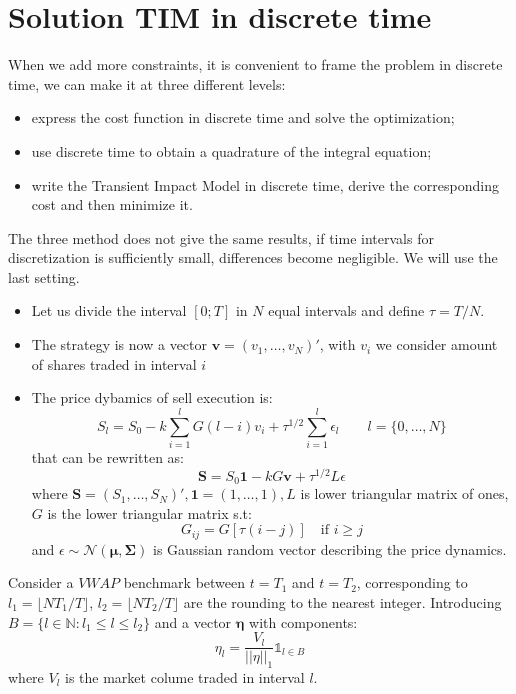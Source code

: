 \section{Solution TIM in discrete time}
When we add more constraints, it is convenient to frame the problem in discrete time, we can make it at three different levels:
\begin{itemize}
	\item express the cost function in discrete time and solve the optimization;
	\item use discrete time to obtain a quadrature of the integral equation;
	\item write the Transient Impact Model in discrete time, derive the corresponding cost and then minimize it.
\end{itemize}
The three method does not give the same results, if time intervals for discretization is sufficiently small, differences become negligible. We will use the last setting.
\begin{mysetting}
	\begin{itemize}
		\item Let us divide the interval $[0;T]$ in $N$ equal intervals and define $\tau = T/N$.
		\item The strategy is now a vector $\textbf{v} = (v_1,\ldots,v_N)'$, with $v_i$ we consider amount of shares traded in interval $i$
		\item The price dybamics of sell execution is:
		\[
		S_l = S_0 -k\sum_{i=1}^{l} G(l-i)v_i + \tau^{1/2} \sum_{i=1}^{l} \epsilon_l \qquad l = \{0,\ldots, N\}
		\]
		that can be rewritten as:
		\[
		\textbf{S} =S_0 \textbf{1} -kG \textbf{v}+ \tau^{1/2} L\epsilon
		\]
		where $\textbf{S} = (S_1,\dots,S_N)', \textbf{1} = (1,\ldots,1), L$ is lower triangular matrix of ones, $G$ is the lower triangular matrix s.t:
		\[
		G_{ij} = G[\tau(i-j)] \quad \text{if } i\geq j 
		\]
		and $\epsilon \sim \mathcal{N}(\mathbf{\mu},\mathbf{\Sigma})$ is Gaussian random vector describing the price dynamics.
	\end{itemize}
\end{mysetting}
Consider a $VWAP$ benchmark between $t=T_1$ and $t=T_2$, corresponding to $l_1 = \lfloor NT_1/T\rfloor$, $l_2 = \lfloor NT_2/T\rfloor$ are the rounding to the nearest integer. Introducing $B = \{l \in \mathbb{N}: l_1 \leq l \leq l_2 \}$ and a vector $\mathbf{\eta}$ with components:
\[
\eta_l = \frac{V_l}{||\eta||_1} \mathds{1}_{l \in B}
\]
where $V_l$ is the market colume traded in interval $l$.\\
